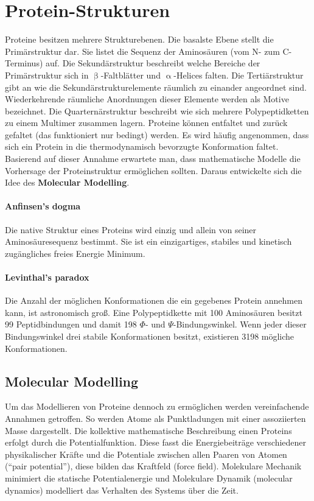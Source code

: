 \documentclass
[
   draft,     %
   paper=a4,%
   paper=portrait, %
   pagesize=auto, %
   fontsize=11pt,%
   abstract=true, %
   titlepage=true %
 ]
 {scrartcl}
\begin{document}
\section{Protein-Strukturen}

Proteine besitzen mehrere Strukturebenen. Die basalste Ebene stellt die Primärstruktur dar. Sie listet die Sequenz der Aminosäuren (vom N- zum C-Terminus) auf. Die Sekundärstruktur beschreibt welche Bereiche der Primärstruktur sich in $\upbeta$-Faltblätter und $\upalpha$-Helices falten. Die Tertiärstruktur gibt an wie die Sekundärstrukturelemente räumlich zu einander angeordnet sind. Wiederkehrende räumliche Anordnungen dieser Elemente werden als Motive bezeichnet. Die Quarternärstruktur beschreibt wie sich mehrere Polypeptidketten zu einem Multimer zusammen lagern. Proteine können entfaltet und zurück gefaltet (das funktioniert nur bedingt) werden. Es wird häufig angenommen, dass sich ein Protein in die thermodynamisch bevorzugte Konformation faltet. Basierend auf dieser Annahme erwartete man, dass mathematische Modelle die Vorhersage der Proteinstruktur ermöglichen sollten. Daraus entwickelte sich die Idee des \textbf{Molecular Modelling}.

\paragraph{Anfinsen’s dogma}
Die native Struktur eines Proteins wird einzig und allein von seiner Aminosäuresequenz bestimmt. Sie ist ein einzigartiges, stabiles und kinetisch zugängliches freies Energie Minimum.

\paragraph{Levinthal’s paradox}
Die Anzahl der möglichen Konformationen die ein gegebenes Protein annehmen kann, ist astronomisch groß. Eine Polypeptidkette mit 100 Aminosäuren besitzt 99 Peptidbindungen und damit 198 $\Phi$- und $\Psi$-Bindungswinkel. Wenn jeder dieser Bindungswinkel drei stabile Konformationen besitzt, existieren 3198 mögliche Konformationen.

\subsection{Molecular Modelling}
Um das Modellieren von Proteine  dennoch zu ermöglichen werden vereinfachende Annahmen getroffen. So werden Atome als Punktladungen mit einer assoziierten Masse dargestellt. Die kollektive mathematische Beschreibung einen Proteins erfolgt durch die Potentialfunktion. Diese fasst die Energiebeiträge verschiedener physikalischer Kräfte und die Potentiale zwischen allen Paaren von Atomen (“pair potential”), diese bilden das Kraftfeld (force field). Molekulare Mechanik minimiert die statische Potentialenergie und Molekulare Dynamik (molecular dynamics) modelliert das Verhalten des Systems über die Zeit.
\end{document}
